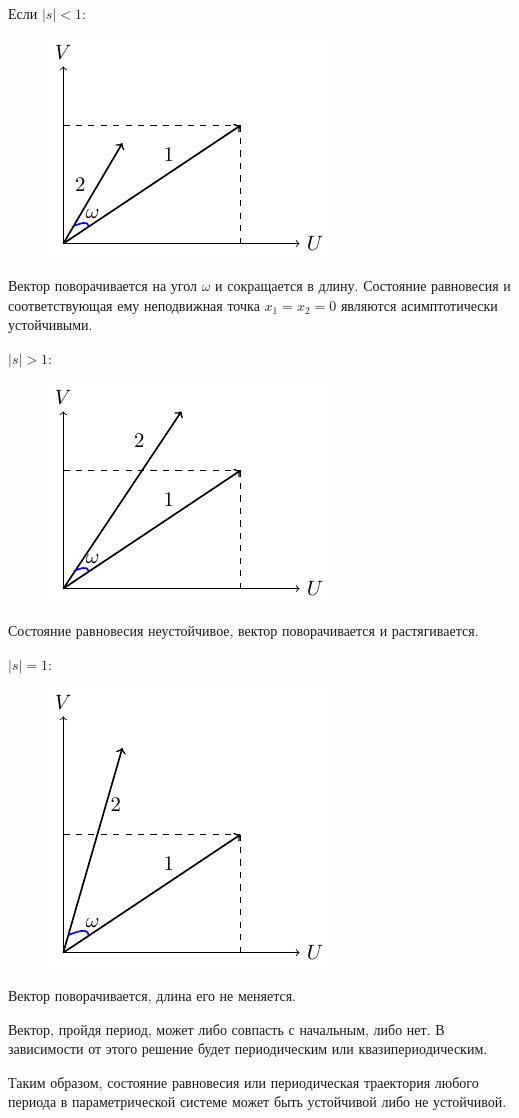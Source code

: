 Если $|s|<1$:
\begin{figure}[H]
	\centering
	\includegraphics[width=0.35\linewidth]{fig/fig38.pdf}   
\end{figure}

Вектор поворачивается на угол $\omega$ и сокращается в длину. Состояние равновесия и соответствующая ему неподвижная точка $x_1=x_2=0$ являются асимптотически устойчивыми.

$|s|>1$:
\begin{figure}[H]
	\centering
	\includegraphics[width=0.35\linewidth]{fig/fig39.pdf}   
\end{figure}

Состояние равновесия неустойчивое, вектор поворачивается и растягивается.

$|s|=1$:
\begin{figure}[H]
	\centering
	\includegraphics[width=0.35\linewidth]{fig/fig40.pdf}   
\end{figure}

Вектор поворачивается, длина его не меняется. 

Вектор, пройдя период, может либо совпасть с начальным, либо нет. В зависимости от этого решение будет периодическим или квазипериодическим.

Таким образом, состояние равновесия или периодическая траектория любого периода в параметрической системе может быть устойчивой либо не устойчивой.

